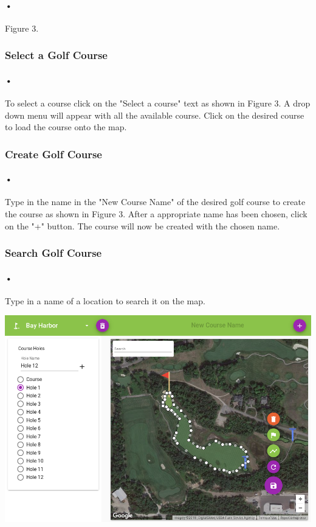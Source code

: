 \documentclass{article}
\begin{document}
    \paragraph{•}
    Figure 3.
    
	\subsubsection{Select a Golf Course}    
	\paragraph{•}    
	To select a course click on the "Select a course" text as shown in Figure 3. A drop down menu will appear with all the available course. Click on the desired course to load the course onto the map.    
    
    
    \subsubsection{Create Golf Course}
    \paragraph{•}
    Type in the name in the "New Course Name" of the desired golf course to create the course as shown in Figure 3. After a appropriate name has been chosen, click on the "+" button. The course will now be created with the chosen name.
	
	\subsubsection{Search Golf Course}
	\paragraph{•}    
    Type in a name of a location to search it on the map.
    
    \includegraphics[scale=0.4]{map1}
\end{document}
